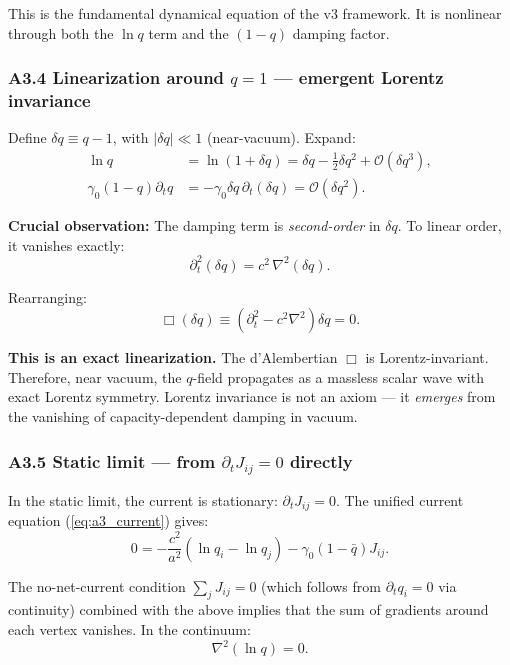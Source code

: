 \documentclass[reprint]{revtex4-2}
\begin{document}
This is the fundamental dynamical equation of the v3 framework. It is nonlinear through both the $\ln q$ term and the $(1-q)$ damping factor.

\subsubsection{A3.4 Linearization around $q=1$ --- emergent Lorentz invariance}

Define $\delta q \equiv q-1$, with $|\delta q| \ll 1$ (near-vacuum). Expand:
\begin{align}
\ln q &= \ln(1 + \delta q) = \delta q - \frac{1}{2}\delta q^2 + \mathcal{O}(\delta q^3), \\
\gamma_0(1-q)\partial_t q &= -\gamma_0\delta q\,\partial_t(\delta q) = \mathcal{O}(\delta q^2).
\end{align}

\textbf{Crucial observation:} The damping term is \emph{second-order} in $\delta q$. To linear order, it vanishes exactly:
\begin{equation}
\partial_t^2(\delta q) = c^2\,\nabla^2(\delta q).
\end{equation}

Rearranging:
\begin{equation}
\boxed{\Box(\delta q) \equiv \left(\partial_t^2 - c^2\nabla^2\right)\delta q = 0}.
\label{eq:a3_dalembert}
\end{equation}

\textbf{This is an exact linearization.} The d'Alembertian $\Box$ is Lorentz-invariant. Therefore, near vacuum, the $q$-field propagates as a massless scalar wave with exact Lorentz symmetry. Lorentz invariance is not an axiom --- it \emph{emerges} from the vanishing of capacity-dependent damping in vacuum.

\subsubsection{A3.5 Static limit --- from $\partial_t J_{ij}=0$ directly}

In the static limit, the current is stationary: $\partial_t J_{ij} = 0$. The unified current equation (\ref{eq:a3_current}) gives:
\begin{equation}
0 = -\frac{c^2}{a^2}(\ln q_i - \ln q_j) - \gamma_0(1-\bar{q})J_{ij}.
\end{equation}

The no-net-current condition $\sum_j J_{ij} = 0$ (which follows from $\partial_t q_i = 0$ via continuity) combined with the above implies that the sum of gradients around each vertex vanishes. In the continuum:
\begin{equation}
\boxed{\nabla^2(\ln q) = 0}.
\label{eq:a3_static}
\end{equation}
\end{document}

